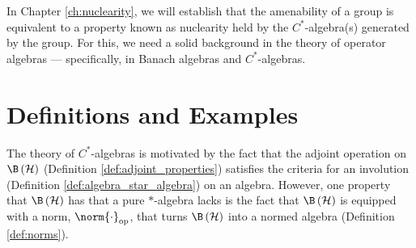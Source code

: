 In Chapter \ref{ch:nuclearity}, we will establish that the amenability of a group is equivalent to a property known as nuclearity held by the $C^{\ast}$-algebra(s) generated by the group. For this, we need a solid background in the theory of operator algebras --- specifically, in Banach algebras and $C^{\ast}$-algebras.
\section{Definitions and Examples}%
The theory of $C^{\ast}$-algebras is motivated by the fact that the adjoint operation on $\B\left( \mathcal{H} \right)$ (Definition \ref{def:adjoint_properties}) satisfies the criteria for an involution (Definition \ref{def:algebra_star_algebra}) on an algebra. However, one property that $\B\left( \mathcal{H} \right)$ has that a pure $\ast$-algebra lacks is the fact that $\B\left( \mathcal{H} \right)$ is equipped with a norm, $\norm{\cdot}_{\op}$, that turns $\B\left( \mathcal{H} \right)$ into a normed algebra (Definition \ref{def:norms}).\newline

